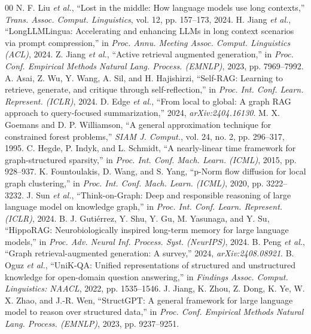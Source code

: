 \documentclass[conference]{IEEEtran}
\begin{document}
\begin{thebibliography}{00}
 N. F. Liu \emph{et al.}, ``Lost in the middle: How language models use long contexts,'' \emph{Trans. Assoc. Comput. Linguistics}, vol. 12, pp. 157--173, 2024.
 H. Jiang \emph{et al.}, ``LongLLMLingua: Accelerating and enhancing LLMs in long context scenarios via prompt compression,'' in \emph{Proc. Annu. Meeting Assoc. Comput. Linguistics (ACL)}, 2024.
 Z. Jiang \emph{et al.}, ``Active retrieval augmented generation,'' in \emph{Proc. Conf. Empirical Methods Natural Lang. Process. (EMNLP)}, 2023, pp. 7969--7992.
 A. Asai, Z. Wu, Y. Wang, A. Sil, and H. Hajishirzi, ``Self-RAG: Learning to retrieve, generate, and critique through self-reflection,'' in \emph{Proc. Int. Conf. Learn. Represent. (ICLR)}, 2024.
 D. Edge \emph{et al.}, ``From local to global: A graph RAG approach to query-focused summarization,'' 2024, \emph{arXiv:2404.16130}.
 M. X. Goemans and D. P. Williamson, ``A general approximation technique for constrained forest problems,'' \emph{SIAM J. Comput.}, vol. 24, no. 2, pp. 296--317, 1995.
 C. Hegde, P. Indyk, and L. Schmidt, ``A nearly-linear time framework for graph-structured sparsity,'' in \emph{Proc. Int. Conf. Mach. Learn. (ICML)}, 2015, pp. 928--937.
 K. Fountoulakis, D. Wang, and S. Yang, ``p-Norm flow diffusion for local graph clustering,'' in \emph{Proc. Int. Conf. Mach. Learn. (ICML)}, 2020, pp. 3222--3232.
 J. Sun \emph{et al.}, ``Think-on-Graph: Deep and responsible reasoning of large language model on knowledge graph,'' in \emph{Proc. Int. Conf. Learn. Represent. (ICLR)}, 2024.
 B. J. Gutiérrez, Y. Shu, Y. Gu, M. Yasunaga, and Y. Su, ``HippoRAG: Neurobiologically inspired long-term memory for large language models,'' in \emph{Proc. Adv. Neural Inf. Process. Syst. (NeurIPS)}, 2024.
 B. Peng \emph{et al.}, ``Graph retrieval-augmented generation: A survey,'' 2024, \emph{arXiv:2408.08921}.
 B. Oguz \emph{et al.}, ``UniK-QA: Unified representations of structured and unstructured knowledge for open-domain question answering,'' in \emph{Findings Assoc. Comput. Linguistics: NAACL}, 2022, pp. 1535--1546.
 J. Jiang, K. Zhou, Z. Dong, K. Ye, W. X. Zhao, and J.-R. Wen, ``StructGPT: A general framework for large language model to reason over structured data,'' in \emph{Proc. Conf. Empirical Methods Natural Lang. Process. (EMNLP)}, 2023, pp. 9237--9251.

\end{thebibliography}
\end{document}
